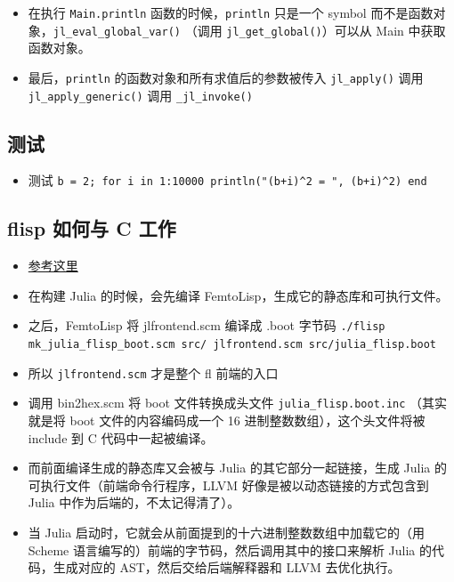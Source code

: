 \begin{itemize}
\begin{lstlisting}[language=cpp]
    struct _jl_module_t *parent;
    _Atomic(jl_svec_t*) bindings;
    _Atomic(jl_array_t*) bindingkeyset; // index lookup by name into bindings
    // hidden fields:
    arraylist_t usings;  // modules with all bindings potentially imported
    jl_uuid_t build_id;
    jl_uuid_t uuid;
    size_t primary_world;
    _Atomic(uint32_t) counter;
    int32_t nospecialize;  // global bit flags: initialization for new methods
    int8_t optlevel;
    int8_t compile;
    int8_t infer;
    uint8_t istopmod;
    int8_t max_methods;
    jl_mutex_t lock;
    intptr_t hash;
} jl_module_t;
\end{lstlisting}
\item 在执行 \verb`Main.println` 函数的时候，\verb`println` 只是一个 symbol 而不是函数对象，\verb`jl_eval_global_var()` （调用 \verb`jl_get_global()`）可以从 Main 中获取函数对象。
\item 最后，\verb`println` 的函数对象和所有求值后的参数被传入 \verb`jl_apply()` 调用 \verb`jl_apply_generic()` 调用 \verb`_jl_invoke()`
\end{itemize}

\subsection{测试}
\begin{itemize}
\item 测试 \verb`b = 2; for i in 1:10000 println("(b+i)^2 = ", (b+i)^2) end`
\end{itemize}

\subsection{flisp 如何与 C 工作}
\begin{itemize}
\item \href{https://zhuanlan.zhihu.com/p/597444640}{参考这里}
\item 在构建 Julia 的时候，会先编译 FemtoLisp，生成它的静态库和可执行文件。
\item 之后，FemtoLisp 将 jlfrontend.scm 编译成 .boot 字节码 \verb`./flisp mk_julia_flisp_boot.scm src/ jlfrontend.scm src/julia_flisp.boot`
\item 所以 \verb`jlfrontend.scm` 才是整个 fl 前端的入口
\item 调用 bin2hex.scm 将 boot 文件转换成头文件 \verb`julia_flisp.boot.inc` （其实就是将 boot 文件的内容编码成一个 16 进制整数数组），这个头文件将被 include 到 C 代码中一起被编译。
\item 而前面编译生成的静态库又会被与 Julia 的其它部分一起链接，生成 Julia 的可执行文件（前端命令行程序，LLVM 好像是被以动态链接的方式包含到 Julia 中作为后端的，不太记得清了）。
\item 当 Julia 启动时，它就会从前面提到的十六进制整数数组中加载它的（用 Scheme 语言编写的）前端的字节码，然后调用其中的接口来解析 Julia 的代码，生成对应的 AST，然后交给后端解释器和 LLVM 去优化执行。
\end{itemize}
